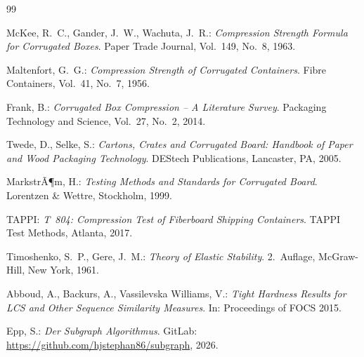 ﻿\documentclass[a4paper,12pt]{article}
\theoremstyle{definition}
\begin{document}
\begin{thebibliography}{99}

McKee, R.~C., Gander, J.~W., Wachuta, J.~R.:
\emph{Compression Strength Formula for Corrugated Boxes}.
Paper Trade Journal, Vol.~149, No.~8, 1963.

Maltenfort, G.~G.:
\emph{Compression Strength of Corrugated Containers}.
Fibre Containers, Vol.~41, No.~7, 1956.

Frank, B.:
\emph{Corrugated Box Compression -- A Literature Survey}.
Packaging Technology and Science, Vol.~27, No.~2, 2014.

Twede, D., Selke, S.:
\emph{Cartons, Crates and Corrugated Board: Handbook of Paper and Wood
Packaging Technology}.
DEStech Publications, Lancaster, PA, 2005.

MarkstrÃ¶m, H.:
\emph{Testing Methods and Standards for Corrugated Board}.
Lorentzen \& Wettre, Stockholm, 1999.

TAPPI:
\emph{T~804: Compression Test of Fiberboard Shipping Containers}.
TAPPI Test Methods, Atlanta, 2017.

Timoshenko, S.~P., Gere, J.~M.:
\emph{Theory of Elastic Stability}.
2.~Auflage, McGraw-Hill, New York, 1961.

Abboud, A., Backurs, A., Vassilevska Williams, V.:
\emph{Tight Hardness Results for LCS and Other Sequence Similarity
Measures}.
In: Proceedings of FOCS 2015.

Epp, S.:
\emph{Der Subgraph Algorithmus}.
GitLab: \url{https://github.com/hjstephan86/subgraph}, 2026.

\end{thebibliography}
\end{document}
